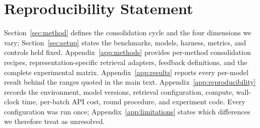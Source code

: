 \documentclass{article}
\begin{document}
\section*{Reproducibility Statement}
Section~\ref{sec:method} defines the consolidation cycle and the four
dimensions we vary; Section~\ref{sec:setup} states the benchmarks, models,
harness, metrics, and controls held fixed. Appendix~\ref{app:methods} provides
per-method consolidation recipes, representation-specific retrieval adapters,
feedback definitions, and the complete experimental matrix.
Appendix~\ref{app:results} reports every per-model result behind the ranges
quoted in the main text. Appendix~\ref{app:reproducibility} records the
environment, model versions, retrieval configuration, compute, wall-clock
time, per-batch API cost, round procedure, and experiment code. Every
configuration was run once; Appendix~\ref{app:limitations} states which
differences we therefore treat as unresolved.

\clearpage




\newpage
\appendix







\end{document}
